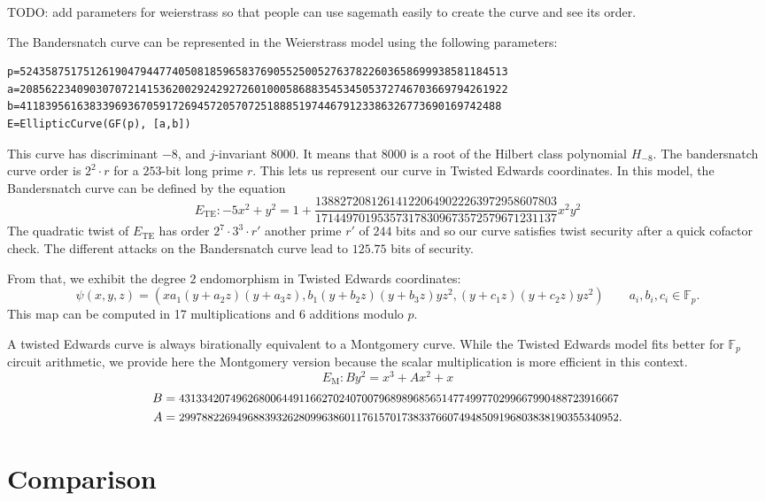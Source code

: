 \documentclass{amsart}
\newcommand{\SM}[1]{\color{blue}#1\color{black}}
\newcommand{\Fp}{\ensuremath{\mathbb F_p}}
\begin{document}
\SM{TODO: add parameters for weierstrass so that people can use sagemath
  easily to create the curve and see its order.}

The Bandersnatch curve can be represented in the Weierstrass model
using the following parameters:
\begin{verbatim}
p=52435875175126190479447740508185965837690552500527637822603658699938581184513
a=20856223409030707214153620029242927260100058688354534505372746703669794261922
b=4118395616383396936705917269457205707251888519744679123386326773690169742488
E=EllipticCurve(GF(p), [a,b])
\end{verbatim}
This curve has discriminant $-8$, and $j$-invariant $8000$. It means
that $8000$ is a root of the Hilbert class polynomial $H_{-8}$.
The bandersnatch curve order is $2^2\cdot r$ for a $253$-bit long
prime $r$.
This lets us represent our curve in Twisted Edwards coordinates.
In this model, the Bandersnatch curve can be defined by the equation
$$E_\text{TE}:-5x^2+y^2 = 1 + \frac{138827208126141220649022263972958607803}{171449701953573178309673572579671231137}x^2y^2$$ 
The quadratic twist of $E_\text{TE}$ has order $2^7 \cdot 3^3 \cdot r'$ another
prime $r'$ of $244$ bits
and so our curve satisfies twist security after a quick cofactor
check.
The different attacks on the Bandersnatch curve lead to $125.75$ bits
of security.

From that, we exhibit the degree $2$ endomorphism in Twisted Edwards
coordinates:
$$\psi(x,y,z) = (xa_1(y+a_2z)(y+a_3z), b_1(y+b_2z)(y+b_3z)yz^2,
(y+c_1z)(y+c_2z)yz^2) \qquad a_i, b_i, c_i \in \Fp.$$
This map can be computed in 17 multiplications and 6 additions modulo $p$.

A twisted Edwards curve is always birationally equivalent to a
Montgomery curve.
While the Twisted Edwards model fits better for $\mathbb F_p$ circuit
arithmetic, we provide here the Montgomery version because the scalar
multiplication is more efficient in this context.
$$E_\text{M}: By^2 = x^3 + Ax^2 + x$$
\begin{align*}
  B &= \text{\small{43133420749626800644911662702407007968989685651477499770299667990488723916667}}\\
  A &= \text{\small{29978822694968839326280996386011761570173833766074948509196803838190355340952}}.
\end{align*}


\section{Comparison}
\end{document}
